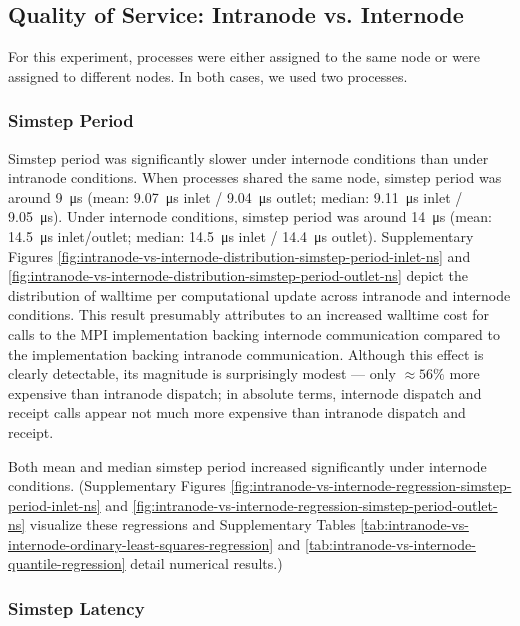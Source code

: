 \subsection{Quality of Service: Intranode vs. Internode}

For this experiment, processes were either assigned to the same node or were assigned to different nodes.
In both cases, we used two processes.

\subsubsection{Simstep Period}

Simstep period was significantly slower under internode conditions than under intranode conditions.
When processes shared the same node, simstep period was around \SI{9}{\micro\second} (mean: \SI{9.07}{\micro\second} inlet / \SI{9.04}{\micro\second} outlet; median: \SI{9.11}{\micro\second} inlet / \SI{9.05}{\micro\second}).
Under internode conditions, simstep period was around \SI{14}{\micro\second} (mean: \SI{14.5}{\micro\second} inlet/outlet; median: \SI{14.5}{\micro\second} inlet / \SI{14.4}{\micro\second} outlet).
Supplementary Figures \ref{fig:intranode-vs-internode-distribution-simstep-period-inlet-ns} and \ref{fig:intranode-vs-internode-distribution-simstep-period-outlet-ns} depict the distribution of walltime per computational update across intranode and internode conditions.
This result presumably attributes to an increased walltime cost for calls to the MPI implementation backing internode communication compared to the implementation backing intranode communication.
Although this effect is clearly detectable, its magnitude is surprisingly modest --- only $\approx 56\%$ more expensive than intranode dispatch;
in absolute terms, internode dispatch and receipt calls appear not much more expensive than intranode dispatch and receipt.

Both mean and median simstep period increased significantly under internode conditions.
(Supplementary Figures \ref{fig:intranode-vs-internode-regression-simstep-period-inlet-ns} and \ref{fig:intranode-vs-internode-regression-simstep-period-outlet-ns} visualize these regressions and Supplementary Tables \ref{tab:intranode-vs-internode-ordinary-least-squares-regression} and \ref{tab:intranode-vs-internode-quantile-regression} detail numerical results.)

\subsubsection{Simstep Latency}

